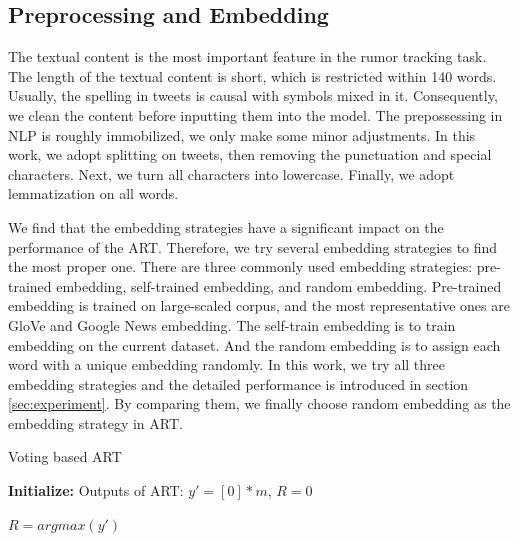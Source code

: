 \subsection{Preprocessing and Embedding}
\label{sec:process_embedding}
The textual content is the most important feature in the rumor tracking task. The length of the textual content is short, which is restricted within 140 words. Usually, the spelling in tweets is causal with symbols mixed in it. Consequently, we clean the content before inputting them into the model. The prepossessing in NLP is roughly immobilized, we only  make some minor adjustments. In this work, we adopt splitting on tweets, then removing the punctuation and special characters. Next, we turn all characters into lowercase. Finally, we adopt lemmatization on all words.

We find that the embedding strategies have a significant impact on the performance of the ART. Therefore, we try several embedding strategies to find the most proper one. There are three commonly used embedding strategies: pre-trained embedding, self-trained embedding, and random embedding. Pre-trained embedding is trained on large-scaled corpus, and the most representative ones are GloVe \cite{DBLP:conf/emnlp/PenningtonSM14} and Google News embedding\cite{googlenews}. The self-train embedding is to train embedding on the current dataset. And the random embedding is to assign each word with a unique embedding randomly. In this work, we try all three embedding strategies and the detailed performance is introduced in section \ref{sec:experiment}. By comparing them, we finally choose random embedding as the embedding strategy in ART.

\begin{algorithm}[tbp]
	\caption{Voting based ART}
	\label{algorithm:art}
	\LinesNumbered %
	\textbf{Initialize:} Outputs of ART: $y' = [0]*m$, $R = 0$ \;
	
	
	$R = argmax(y')$
\end{algorithm}

